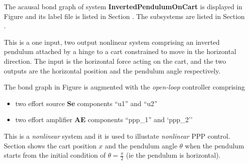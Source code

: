 

   The acausal bond graph of system \textbf{InvertedPendulumOnCart} is
   displayed in Figure  and its label
   file is listed in Section .
   The subsystems are listed in Section .

This is a one input, two output nonlinear system comprising an
inverted pendulum attached by a hinge to a cart constrained to move in
the horizontal direction. The input is the horizontal force acting on
the cart, and the two outputs are the horizontal position and the
pendulum angle respectively.

The bond graph in Figure  is augmented with the {\em
open-loop\/} controller comprising
\begin{itemize}
\item two effort source \textbf{Se} components ``u1'' and ``u2''
\item two effort amplifier \textbf{AE} components ``ppp\_1'' and `ppp\_2''
\end{itemize}

This is a \emph{nonlinear} system and it is used to illustate
\emph{nonlinear} PPP control. Section
 shows the cart position
$x$ and the pendulum angle $\theta$  when the pendulum starts from the
initial condition of  $\theta = \frac{\pi}{2}$ (ie the pendulum is
horizontal).
 

